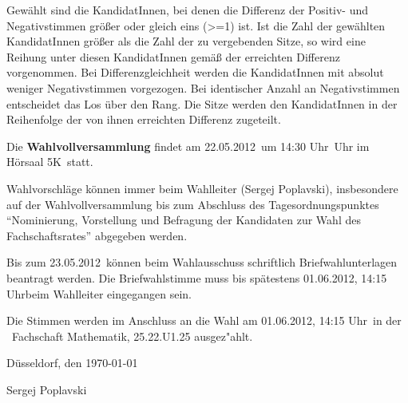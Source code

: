 \documentclass[a4paper,10pt]{scrartcl}
\def\wahlvvDatum{22.05.2012}
\def\wahlvvUhr{14:30 Uhr}
\def\wahlvvSaal{5K}
\def\buero{Fachschaft Mathematik, 25.22.U1.25}
\def\wahlleiter{Sergej Poplavski}
\def\briefwahlAntrag{23.05.2012}
\def\briefwahlEnde{01.06.2012, 14:15 Uhr}
\def\auszaehlung{01.06.2012, 14:15 Uhr}
\begin{document}
Gewählt sind die KandidatInnen, bei denen die Differenz der Positiv- und Negativstimmen größer oder gleich eins (>=1) ist. 
Ist die Zahl der gewählten KandidatInnen größer als die Zahl der zu vergebenden Sitze, so wird eine Reihung unter diesen KandidatInnen gemäß der erreichten Differenz vorgenommen. 
Bei Differenzgleichheit werden die KandidatInnen mit absolut weniger Negativstimmen vorgezogen. Bei identischer Anzahl an Negativstimmen entscheidet das Los über den Rang. 
Die Sitze werden den KandidatInnen in der Reihenfolge der von ihnen erreichten Differenz zugeteilt.


Die \textbf{Wahlvollversammlung} findet am \wahlvvDatum ~um \wahlvvUhr ~Uhr im Hörsaal \wahlvvSaal ~statt.

Wahlvorschläge können immer beim Wahlleiter (\wahlleiter ), insbesondere auf der Wahlvollversammlung bis zum Abschluss des Tagesordnungspunktes ``Nominierung, Vorstellung und Befragung der Kandidaten zur Wahl des Fachschaftsrates'' abgegeben werden. 

Bis zum \briefwahlAntrag ~können beim Wahlausschuss schriftlich Briefwahlunterlagen beantragt werden. Die Briefwahl\-stimme muss bis spätestens \briefwahlEnde beim Wahlleiter eingegangen sein.

Die Stimmen werden im Anschluss an die Wahl am \auszaehlung ~in der ~\buero \phantom{.} ausgez"ahlt.


Düsseldorf, den \today

\vspace{2\baselineskip}

\wahlleiter
\end{document}

